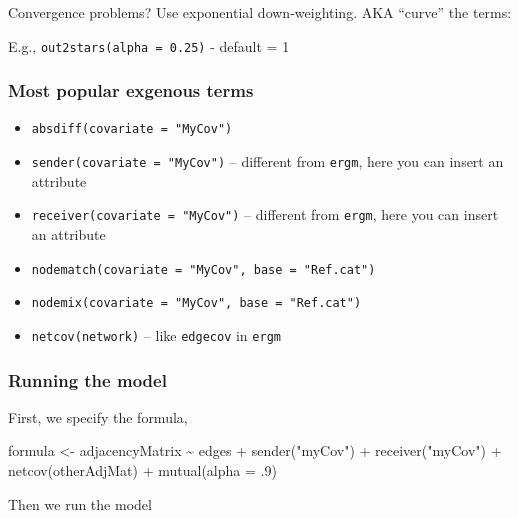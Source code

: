 \documentclass[
]{article}
\newenvironment{Shaded}{\begin{snugshade}}{\end{snugshade}}
\newcommand{\AttributeTok}[1]{\textcolor[rgb]{0.77,0.63,0.00}{#1}}
\newcommand{\DecValTok}[1]{\textcolor[rgb]{0.00,0.00,0.81}{#1}}
\newcommand{\FunctionTok}[1]{\textcolor[rgb]{0.00,0.00,0.00}{#1}}
\newcommand{\NormalTok}[1]{#1}
\newcommand{\OtherTok}[1]{\textcolor[rgb]{0.56,0.35,0.01}{#1}}
\newcommand{\SpecialCharTok}[1]{\textcolor[rgb]{0.00,0.00,0.00}{#1}}
\newcommand{\StringTok}[1]{\textcolor[rgb]{0.31,0.60,0.02}{#1}}
\begin{document}
Convergence problems? Use exponential down-weighting. AKA ``curve'' the
terms:

E.g., \texttt{out2stars(alpha\ =\ 0.25)} - default = 1

\hypertarget{most-popular-exgenous-terms}{%
\subsubsection{Most popular exgenous
terms}\label{most-popular-exgenous-terms}}

\begin{itemize}
\item
  \texttt{absdiff(covariate\ =\ "MyCov")}
\item
  \texttt{sender(covariate\ =\ "MyCov")} -- different from
  \texttt{ergm}, here you can insert an attribute
\item
  \texttt{receiver(covariate\ =\ "MyCov")} -- different from
  \texttt{ergm}, here you can insert an attribute
\item
  \texttt{nodematch(covariate\ =\ "MyCov",\ base\ =\ "Ref.cat")}
\item
  \texttt{nodemix(covariate\ =\ "MyCov",\ base\ =\ "Ref.cat")}
\item
  \texttt{netcov(network)} -- like \texttt{edgecov} in \texttt{ergm}
\end{itemize}

\hypertarget{running-the-model}{%
\subsubsection{Running the model}\label{running-the-model}}

First, we specify the formula,

\begin{Shaded}
\begin{Highlighting}[]
\NormalTok{formula }\OtherTok{\textless{}{-}}\NormalTok{ adjacencyMatrix }\SpecialCharTok{\textasciitilde{}}\NormalTok{ edges }\SpecialCharTok{+}
  \FunctionTok{sender}\NormalTok{(}\StringTok{"myCov"}\NormalTok{) }\SpecialCharTok{+}
  \FunctionTok{receiver}\NormalTok{(}\StringTok{"myCov"}\NormalTok{) }\SpecialCharTok{+}
  \FunctionTok{netcov}\NormalTok{(otherAdjMat) }\SpecialCharTok{+}
  \FunctionTok{mutual}\NormalTok{(}\AttributeTok{alpha =}\NormalTok{ .}\DecValTok{9}\NormalTok{)}
\end{Highlighting}
\end{Shaded}

Then we run the model
\end{document}
